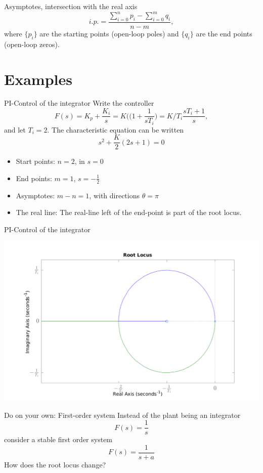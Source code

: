 \documentclass[presentation,aspectratio=169]{beamer}
\begin{document}
\begin{frame}[label={sec:org1d8f892}]{Asymptotes, intersection with the real axis}
\[ i.p. = \frac{ \sum_{i=0}^n p_i - \sum_{i=0}^m q_i}{n-m}, \]
where \(\{p_i\}\) are the starting points (open-loop poles) and \(\{q_i\}\) are the end points (open-loop zeros). 
\end{frame}

\section{Examples}
\label{sec:org06f35c8}
\begin{frame}[label={sec:org7a92958}]{PI-Control of the integrator}
Write the controller 
\[ F(s) = K_p + \frac{K_i}{s} = K\big(( 1 + \frac{1}{sT_i}\Big) = K/T_i \frac{sT_i + 1}{s}, \]
and let \(T_i = 2\). 
The characteristic equation can be written
\[ s^2 + \frac{K}{2}(2s + 1) = 0\]

\begin{itemize}
\item Start points: \(n=2\), in  \(s=0\)
\item End points: \(m=1\), \(s=-\frac{1}{2}\)
\item Asymptotes: \(m-n=1\), with directions \(\theta=\pi\)
\item The real line: The real-line left of the end-point is part of the root locus.
\end{itemize}
\end{frame}

\begin{frame}[label={sec:org88a3882}]{PI-Control of the integrator}
\begin{center}
\includegraphics[width=0.8\linewidth]{../../figures/rlocus-integrator-PI}
\end{center}
\end{frame}

\begin{frame}[label={sec:org0bbe7ce}]{Do on your own: First-order system}
Instead of the plant being an integrator
\[ F(s) = \frac{1}{s}\]
consider a stable first order system
\[ F(s) = \frac{1}{s+a}\]
How does the root locus change?
\end{frame}
\end{document}
